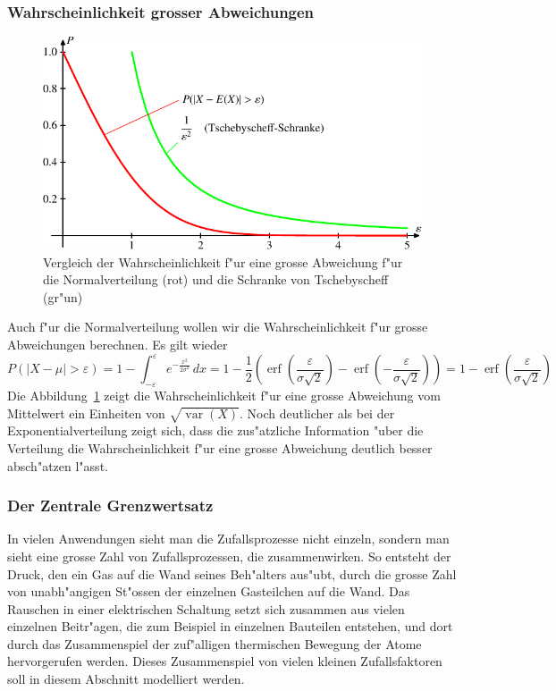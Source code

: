 \subsubsection{Wahrscheinlichkeit grosser Abweichungen}
\begin{figure}
\begin{center}
\includegraphics{images/norm-1.pdf}
\end{center}
\caption{Vergleich der Wahrscheinlichkeit f"ur eine grosse Abweichung
f"ur die Normalverteilung (rot) und die Schranke von Tschebyscheff (gr"un)
\label{abweichung-normalverteilung}}
\end{figure}

Auch f"ur die Normalverteilung wollen wir die Wahrscheinlichkeit
f"ur grosse Abweichungen berechnen.
Es gilt wieder
\[
P(|X-\mu|>\varepsilon)
=1-\int_{-\varepsilon}^{\varepsilon}e^{-\frac{x^2}{2\sigma^2}}\,dx
=
1-{\textstyle\frac12}(\operatorname{erf}({\textstyle\frac{\varepsilon}{\sigma\sqrt{2}}})-\operatorname{erf}({\textstyle-\frac{\varepsilon}{\sigma\sqrt{2}}}))
=
1-\operatorname{erf}({\textstyle\frac{\varepsilon}{\sigma\sqrt{2}}})
\]
Die Abbildung~\ref{abweichung-normalverteilung} zeigt die Wahrscheinlichkeit
f"ur eine grosse Abweichung vom Mittelwert ein Einheiten
von $\sqrt{\operatorname{var}(X)}$.
Noch deutlicher als bei der
Exponentialverteilung zeigt sich, dass die zus"atzliche Information
"uber die Verteilung die Wahrscheinlichkeit f"ur eine grosse
Abweichung deutlich besser absch"atzen l"asst.

\subsubsection{Der Zentrale Grenzwertsatz}
\label{zentraler-grenzwertsatz}
In vielen Anwendungen sieht man die Zufallsprozesse nicht einzeln, sondern
man sieht eine grosse Zahl von Zufallsprozessen, die zusammenwirken.
So entsteht der Druck, den ein Gas auf die Wand seines Beh"alters aus"ubt,
durch die grosse Zahl von unabh"angigen St"ossen der einzelnen Gasteilchen
auf die Wand.
Das Rauschen in einer elektrischen Schaltung setzt sich
zusammen aus vielen einzelnen Beitr"agen, die zum Beispiel in einzelnen
Bauteilen entstehen, und dort durch das Zusammenspiel der zuf"alligen
thermischen Bewegung der Atome hervorgerufen werden.
Dieses Zusammenspiel von vielen kleinen Zufallsfaktoren soll in diesem
Abschnitt modelliert werden.

